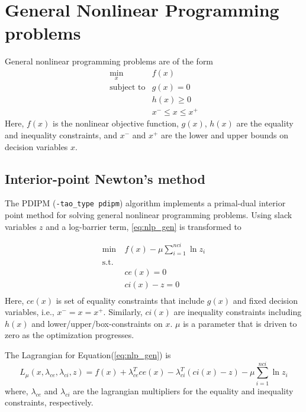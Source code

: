 \documentclass[]{book}
\begin{document}
\section{General Nonlinear Programming problems}
General nonlinear programming problems are of the form
\[
\begin{array}{ll}
\displaystyle \min_{x} & f(x) \\
\mbox{subject to} & g(x) = 0 \\
                  & h(x) \geq 0 \\
                  & x^- \leq x \leq x^+
\end{array}
\label{eq:nlp_gen}
\]
Here, $f(x)$ is the nonlinear objective function, $g(x)$, $h(x)$ are the equality
and inequality constraints, and $x^-$ and $x^+$ are the lower and upper bounds
on decision variables $x$.

\subsection{Interior-point Newton's method}
The PDIPM ({\tt -tao\_type pdipm}) algorithm implements a primal-dual interior point method for solving general
nonlinear programming problems. Using slack variables $z$ and a log-barrier term, \ref{eq:nlp_gen}
is transformed to 

\begin{equation}
    \begin{aligned}
    \text{min}~&f(x) - \mu\sum_{i=1}^{nci}\ln z_i\\
    \text{s.t.}& \\
        &ce(x) = 0 \\
        &ci(x) - z = 0 \\
    \end{aligned}
    \label{eq:nlp_gen}
\end{equation}
Here, $ce(x)$ is set of equality constraints that include $g(x)$ and fixed
decision variables, i.e., $x^- = x = x^+$. Similarly, $ci(x)$ are inequality constraints
including $h(x)$ and lower/upper/box-constraints on $x$.
$\mu$ is a parameter that is driven to zero as the optimization progresses.

The Lagrangian for Equation(\ref{eq:nlp_gen}) is
\begin{equation}
    L_{\mu}(x,\lambda_{ce},\lambda_{ci},z) = f(x) + \lambda_{ce}^Tce(x) - \lambda_{ci}^T(ci(x) - z) - \mu\sum_{i=1}^{nci}\ln z_i
    \label{eq:lagrangian}
\end{equation}
where, $\lambda_{ce}$ and $\lambda_{ci}$ are the lagrangian multipliers for the equality and inequality constraints, respectively.
\end{document}
